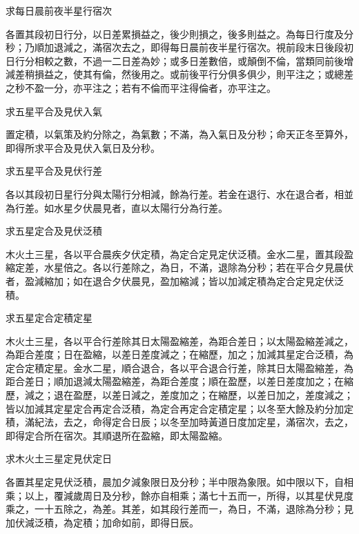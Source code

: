 \begin{pinyinscope}
 求每日晨前夜半星行宿次



 各置其段初日行分，以日差累損益之，後少則損之，後多則益之。為每日行度及分秒；乃順加退減之，滿宿次去之，即得每日晨前夜半星行宿次。視前段末日後段初日行分相較之數，不過一二日差為妙；或多日差數倍，或顛倒不倫，當類同前後增減差稍損益之，使其有倫，然後用之。或前後平行分俱多俱少，則平注之；或總差之秒不盈一分，亦平注之；若有不倫而平注得倫者，亦平注之。



 求五星平合及見伏入氣



 置定積，以氣策及約分除之，為氣數；不滿，為入氣日及分秒；命天正冬至算外，即得所求平合及見伏入氣日及分秒。



 求五星平合及見伏行差



 各以其段初日星行分與太陽行分相減，餘為行差。若金在退行、水在退合者，相並為行差。如水星夕伏晨見者，直以太陽行分為行差。



 求五星定合及見伏泛積



 木火土三星，各以平合晨疾夕伏定積，為定合定見定伏泛積。金水二星，置其段盈縮定差，水星倍之。各以行差除之，為日，不滿，退除為分秒；若在平合夕見晨伏者，盈減縮加；如在退合夕伏晨見，盈加縮減；皆以加減定積為定合定見定伏泛積。



 求五星定合定積定星



 木火土三星，各以平合行差除其日太陽盈縮差，為距合差日；以太陽盈縮差減之，為距合差度；日在盈縮，以差日差度減之；在縮歷，加之；加減其星定合泛積，為定合定積定星。金水二星，順合退合，各以平合退合行差，除其日太陽盈縮差，為距合差日；順加退減太陽盈縮差，為距合差度；順在盈歷，以差日差度加之；在縮歷，減之；退在盈歷，以差日減之，差度加之；在縮歷，以差日加之，差度減之；皆以加減其定星定合再定合泛積，為定合再定合定積定星；以冬至大餘及約分加定積，滿紀法，去之，命得定合日辰；以冬至加時黃道日度加定星，滿宿次，去之，即得定合所在宿次。其順退所在盈縮，即太陽盈縮。



 求木火土三星定見伏定日



 各置其星定見伏泛積，晨加夕減象限日及分秒；半中限為象限。如中限以下，自相乘；以上，覆減歲周日及分秒，餘亦自相乘；滿七十五而一，所得，以其星伏見度乘之，一十五除之，為差。其差，如其段行差而一，為日，不滿，退除為分秒；見加伏減泛積，為定積；加命如前，即得日辰。




\end{pinyinscope}
